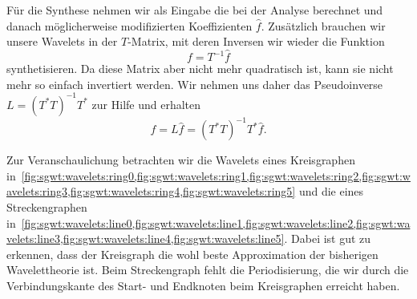 F\"ur die Synthese nehmen wir als Eingabe die bei der Analyse 
berechnet und danach m\"oglicherweise modifizierten Koeffizienten $\hat{f}$. 
Zus\"atzlich brauchen wir unsere Wavelets in der $T$-Matrix, mit deren Inversen 
wir wieder die Funktion
\begin{equation*}
f = T^{-1} \hat{f}
\end{equation*}
synthetisieren. Da diese Matrix aber nicht mehr quadratisch ist, kann sie nicht 
mehr so einfach invertiert werden. Wir nehmen uns daher das Pseudoinverse $L = 
(T^*T)^{-1}T^*$ zur Hilfe und erhalten
\begin{equation}
f = L \hat{f} = (T^*T)^{-1}T^* \hat{f}.
\label{eq:sgwt:pseudof}
\end{equation}

Zur Veranschaulichung betrachten wir die Wavelets eines Kreisgraphen 
in~\cref{fig:sgwt:wavelets:ring0,fig:sgwt:wavelets:ring1,fig:sgwt:wavelets:ring2,fig:sgwt:wavelets:ring3,fig:sgwt:wavelets:ring4,fig:sgwt:wavelets:ring5}
und die eines Streckengraphen 
in~\cref{fig:sgwt:wavelets:line0,fig:sgwt:wavelets:line1,fig:sgwt:wavelets:line2,fig:sgwt:wavelets:line3,fig:sgwt:wavelets:line4,fig:sgwt:wavelets:line5}.
Dabei ist gut zu erkennen, dass der Kreisgraph die wohl beste Approximation der 
bisherigen Wavelettheorie ist. Beim Streckengraph fehlt die Periodisierung, die 
wir durch die Verbindungskante des Start- und Endknoten beim Kreisgraphen 
erreicht haben.
